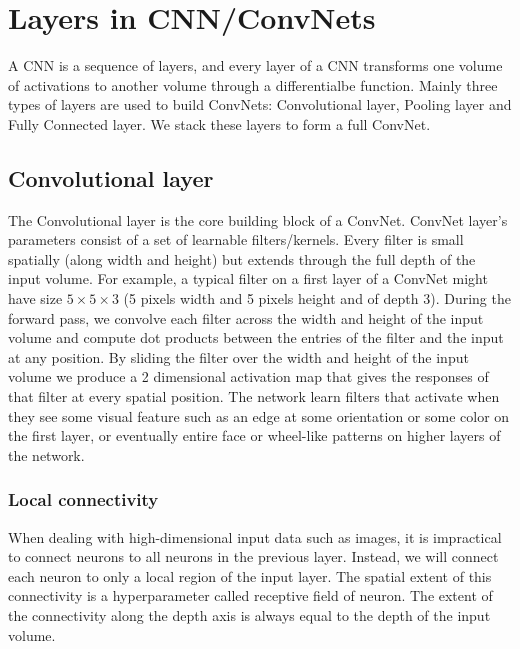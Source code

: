 \section{Layers in CNN/ConvNets} 
A CNN is a sequence of layers, and every layer of a CNN transforms one volume of activations to another volume through a differentialbe function. Mainly three types of layers are used to build ConvNets: Convolutional layer, Pooling layer and Fully Connected layer. We stack these layers to form a full ConvNet. 
\subsection{Convolutional layer} 
The Convolutional layer is the core building block of a ConvNet. ConvNet layer's parameters consist of a set of learnable filters/kernels. Every filter is small spatially (along width and height) but extends through the full depth of the input volume. For example, a typical filter on a first layer of a ConvNet might have size $5 \times 5 \times 3$ (5 pixels width and 5 pixels height and of depth 3). During the forward pass, we convolve each filter across the width and height of the input volume and compute dot products between the entries of the filter and the input at any position. By sliding the filter over the width and height of the input volume we produce a 2 dimensional activation map that gives the responses of that filter at every spatial position. The network learn filters that activate when they see some visual feature such as an edge at some orientation or some color on the first layer, or eventually entire face or wheel-like patterns on higher layers of the network. 
\subsubsection{Local connectivity}
When dealing with high-dimensional input data such as images, it is impractical to connect neurons to all neurons in the  previous layer.
Instead, we will connect each neuron to only a local region of the input layer. The spatial extent of this connectivity is a hyperparameter called receptive field of neuron. The extent of the connectivity along the depth axis is always equal to the depth of the input volume.  
   
